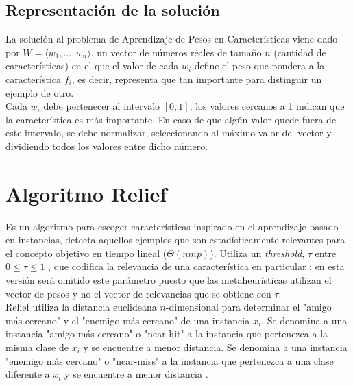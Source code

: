 \documentclass{ci5652}
\begin{document}

\subsection{Representación de la solución}

La solución al problema de Aprendizaje de Pesos en Características viene dado 
por $W = \langle w_1, \dots, w_n\rangle$, un vector de números reales de tamaño
$n$ (cantidad de características) en el que el valor de cada $w_i$  define el
peso que pondera a la  característica $f_i$, es decir, representa que tan
importante para distinguir un ejemplo de otro.\\

Cada $w_i$ debe pertenecer al intervalo $[0,1]$; los valores cercanos a 1 indican
que la característica es más importante. En caso de que algún valor quede fuera
de este intervalo, se debe normalizar, seleccionando al máximo valor del vector
y dividiendo todos los valores entre dicho número. 

\section{Algoritmo Relief}

Es un algoritmo para escoger características inspirado en el aprendizaje basado 
en instancias, detecta aquellos ejemplos que son estadísticamente relevantes 
para el concepto objetivo en tiempo lineal ($\Theta(nmp)$). Utiliza un 
\textit{threshold}, $\tau$ entre $0 \leq \tau \leq 1$ , que codifica la 
relevancia de una característica en particular \cite{Kira_1992};  en esta 
versión será omitido este parámetro puesto que las metaheurísticas utilizan el 
vector de pesos y no el vector de relevancias que se obtiene con $\tau$.\\

Relief utiliza la distancia euclideana $n$-dimensional para determinar el "amigo
más cercano" y el "enemigo más cercano" de una instancia $x_i$. Se denomina a 
una instancia "amigo más cercano" o "near-hit" a la instancia que pertenezca a 
la misma clase de $x_i$ y se encuentre a menor distancia. Se denomina a una 
instancia "enemigo más cercano" o "near-miss" a la instancia que pertenezca a 
una clase diferente a $x_i$ y se encuentre a menor distancia \cite{Kira_1992}.
\end{document}
